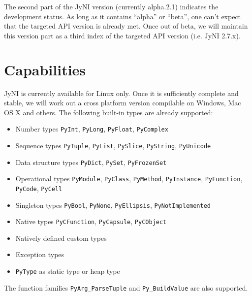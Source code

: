\documentclass[letterpaper,compsoc,twoside]{IEEEtran}
\begin{document}
The second part of the JyNI version (currently alpha.2.1) indicates the development status. As long as it contains
“alpha” or “beta”, one can't expect that the targeted API version is already met. Once out of beta, we will maintain
this version part as a third index of the targeted API version (i.e. JyNI 2.7.x).

\section{Capabilities\label{capabilities}}


JyNI is currently available for Linux only. Once it is sufficiently complete and stable, we will work out a cross platform version compilable on Windows, Mac OS X and others.
The following built-in types are already supported:\begin{itemize}

\item 

Number types \texttt{PyInt}, \texttt{PyLong}, \texttt{PyFloat}, \texttt{PyComplex}
\item 

Sequence types \texttt{PyTuple}, \texttt{PyList}, \texttt{PySlice}, \texttt{PyString}, \texttt{PyUnicode}
\item 

Data structure types \texttt{PyDict}, \texttt{PySet}, \texttt{PyFrozenSet}
\item 

Operational types \texttt{PyModule}, \texttt{PyClass}, \texttt{PyMethod}, \texttt{PyInstance}, \texttt{PyFunction}, \texttt{PyCode}, \texttt{PyCell}
\item 

Singleton types \texttt{PyBool}, \texttt{PyNone}, \texttt{PyEllipsis}, \texttt{PyNotImplemented}
\item 

Native types \texttt{PyCFunction}, \texttt{PyCapsule}, \texttt{PyCObject}
\item 

Natively defined custom types
\item 

Exception types
\item 

\texttt{PyType} as static type or heap type
\end{itemize}


The function families \texttt{PyArg\_ParseTuple} and \texttt{Py\_BuildValue} are also supported.
\end{document}
